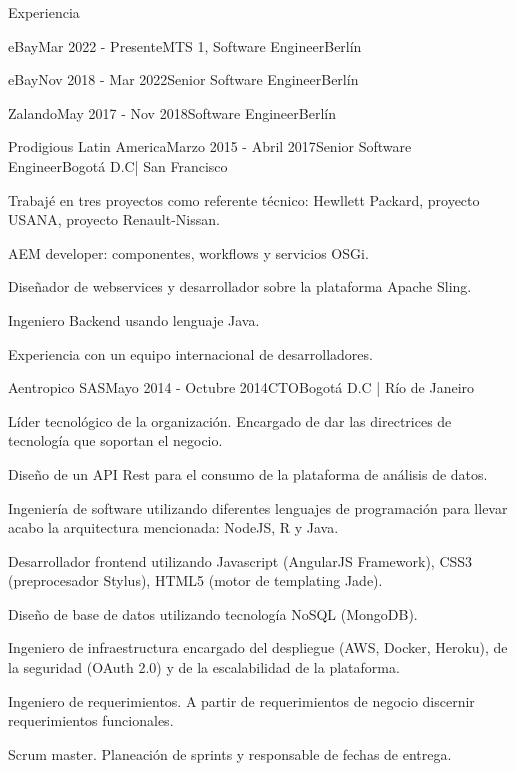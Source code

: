 \documentclass[spanish]{resume} %
\begin{document}
\begin{rSection}{Experiencia}
\begin{rSubsection}{eBay}{Mar 2022 - Presente}{MTS 1, Software Engineer}{Berl\'in}
\begin{rSubsection}{eBay}{Nov 2018 - Mar 2022}{Senior Software Engineer}{Berl\'in}
\begin{rSubsection}{Zalando}{May 2017 - Nov 2018}{Software Engineer}{Berl\'in}
\end{rSubsection}


\begin{rSubsection}{Prodigious Latin America}{Marzo 2015 - Abril 2017}{Senior Software Engineer}{Bogot\'a D.C| San Francisco}
\item Trabajé en tres proyectos como referente técnico: Hewllett Packard, proyecto USANA, proyecto Renault-Nissan.
\item AEM developer: componentes, workflows y servicios OSGi.
\item Diseñador de webservices y desarrollador sobre la plataforma Apache Sling.  
\item Ingeniero Backend usando lenguaje Java.
\item Experiencia con un equipo internacional de desarrolladores.
\end{rSubsection}


\begin{rSubsection}{Aentropico SAS}{Mayo 2014 - Octubre 2014}{CTO}{Bogot\'a D.C | R\'io de Janeiro}
\item L\'ider tecnol\'ogico de la organizaci\'on. Encargado de dar las directrices de tecnolog\'ia que soportan el negocio.
\item Dise\~no de un API Rest para el consumo de la plataforma de an\'alisis de datos.
\item Ingenier\'ia de software utilizando diferentes lenguajes de programaci\'on para llevar acabo la arquitectura mencionada: NodeJS, R y Java.
\item Desarrollador frontend utilizando Javascript (AngularJS Framework), CSS3 (preprocesador Stylus), HTML5 (motor de templating Jade).
\item Dise\~no de base de datos utilizando tecnolog\'ia NoSQL (MongoDB).
\item Ingeniero de infraestructura encargado del despliegue (AWS, Docker, Heroku), de la seguridad (OAuth 2.0) y de la escalabilidad de la plataforma.
\item Ingeniero de requerimientos. A partir de requerimientos de negocio discernir requerimientos funcionales.
\item Scrum master. Planeaci\'on de sprints y responsable de fechas de entrega.
\end{rSubsection}



\end{rSubsection}
\end{rSubsection}
\end{rSection}
\end{document}
